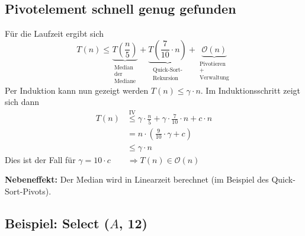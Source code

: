 \documentclass{scrartcl}%
\begin{document}
    \subsection*{Pivotelement schnell genug gefunden}
    Für die Laufzeit ergibt sich
    \begin{equation*}
        T(n) \leq \underbrace{T(\dfrac{n}{5})}_{\substack{\text{Median} \\ \text{der} \\ \text{Mediane}}}
        + \underbrace{T(\dfrac{7}{10} \cdot n)}_{\substack{\text{Quick-Sort-} \\ \text{Rekursion}}}
        + \underbrace{\mathcal{O}(n)}_{\substack{\text{Pivotieren} \\ \text{+} \\ \text{Verwaltung}}}
    \end{equation*}
    Per Induktion kann nun gezeigt werden $T(n)\leq \gamma \cdot n$.
    Im Induktionsschritt zeigt sich dann
    \begin{equation*}
        \begin{flalign}
            T(n) & \overset{\text{IV}}{\leq} \gamma \cdot \frac{n}{5} + \gamma \cdot \frac{7}{10} \cdot n + c \cdot n\\\nonumber
            &= n \cdot (\frac{9}{10} \cdot \gamma + c)\\\nonumber
            &\leq \gamma \cdot n
        \end{flalign}
    \end{equation*}
    Dies ist der Fall für $\gamma = 10 \cdot c\qquad \Longrightarrow T(n) \in \mathcal{O}(n)$

    \textbf{\textsf{Nebeneffekt:}} Der Median wird in Linearzeit berechnet (im Beispiel des Quick-Sort-Pivots).

    \subsection*{Beispiel: Select ($A$, 12)}
\end{document}
